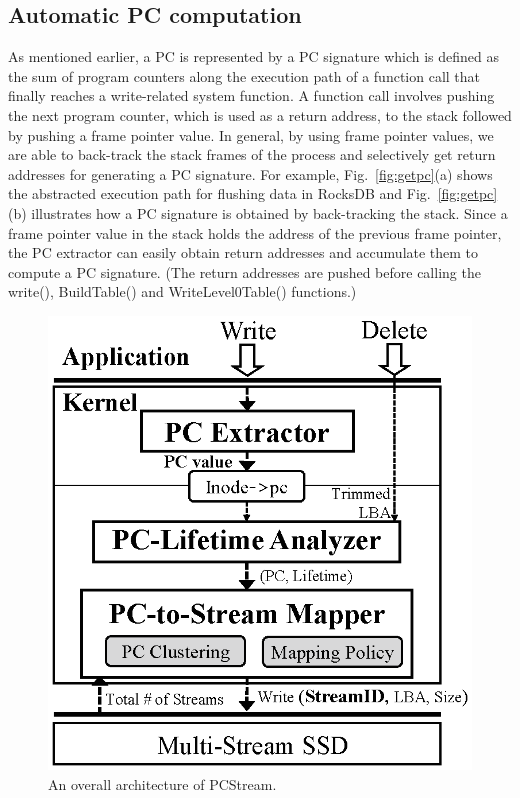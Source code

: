 \subsection{Automatic PC computation}
As mentioned earlier, a PC is represented by a PC signature which is defined as
the sum of program counters along the execution path of a function call that
finally reaches a write-related system function. A function call involves
pushing the next program counter, which is used as a return address, to the
stack followed by pushing a frame pointer value.  In general, by using frame
pointer values, we are able to back-track the stack frames of the process and
selectively get return addresses for generating a PC signature.  For example,
Fig.~\ref{fig:getpc}(a) shows the abstracted execution path for flushing data
in RocksDB and Fig.~\ref{fig:getpc}(b) illustrates how a PC signature is obtained
by back-tracking the stack.  
Since a frame pointer value in the stack holds the address of the previous
frame pointer, the PC extractor can easily obtain return addresses and
accumulate them to compute a PC signature. (The return addresses are pushed
before calling the {\sf write()}, {\sf BuildTable()} and {\sf
WriteLevel0Table()} functions.)


\begin{figure}[t]
	\centering
	\vspace{-7pt}
	\includegraphics[width=0.6\linewidth]{figure/architecture4}
	\vspace{-10pt}
	\caption{An overall architecture of {\sf PCStream}.}
	\label{fig:architecture}
	\vspace{-15pt}
\end{figure}


